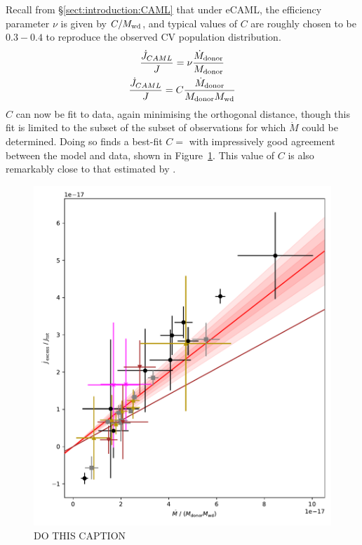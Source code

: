 Recall from \S\ref{sect:introduction:CAML} that under eCAML, the efficiency parameter $\nu$ is given by $C/M_{\rm wd}$, and typical values of $C$ are roughly chosen to be $0.3 - 0.4$ to reproduce the observed CV population distribution.
\begin{gather}
    \frac{\dot J_{CAML}}{J} = \nu \frac{\dot M_{\rm donor}}{M_{\rm donor}} \label{eqn:ecaml general} \\
    \frac{\dot J_{CAML}}{J} = C \frac{\dot M_{\rm donor}}{M_{\rm donor} M_{\rm wd}}
\end{gather}
$C$ can now be fit to data, again minimising the orthogonal distance, though this fit is limited to the subset of the subset of observations for which $\dot M$ could be determined.
Doing so finds a best-fit $C =$ with impressively good agreement between the model and data, shown in Figure~\ref{fig:massloss and AML:calibrating ecaml relationship}. This value of $C$ is also remarkably close to that estimated by \citet{Schreiber2016}. 
\begin{figure}
    \centering
    \includegraphics[width=\textwidth]{figures/results/Mdot/eCAML_nu_no_intercept_fit.pdf}
    \caption{DO THIS CAPTION}
    \label{fig:massloss and AML:calibrating ecaml relationship}
\end{figure}

